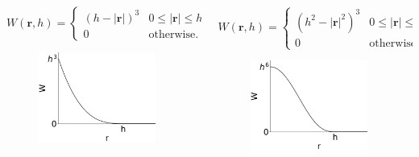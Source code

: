 \documentclass[aspectratio=169]{beamer}
\begin{document}
\begin{frame}
{\begin{columns}
\hspace{-1.2em}
\begin{column}{0.32\textwidth}
{\scriptsize\[
W\left(\mathbf{r}, h\right) = 
\begin{cases} 
    \left(h-\left|\mathbf{r}\right|\right)^3 & 0 \leq \left|\mathbf{r}\right| \leq h \\ 
    0 & \text{otherwise.}
\end{cases}
\]}
\begin{figure}
\includegraphics[width=0.9\textwidth]{pictures/smoothing_kernel_2.png}
\end{figure}
\end{column}


\hspace{-1em}
\begin{column}{0.32\textwidth}
{\scriptsize\[
W\left(\mathbf{r}, h\right) = 
\begin{cases} 
    \left(h^2-\left|\mathbf{r}\right|^2\right)^3 & 0 \leq \left|\mathbf{r}\right| \leq h \\ 
    0 & \text{otherwise.}
\end{cases}
\]}
\begin{figure}
\includegraphics[width=0.9\textwidth]{pictures/smoothing_kernel_3.png}
\end{figure}
\end{column}
\end{columns}
}
\end{frame}
\end{document}
